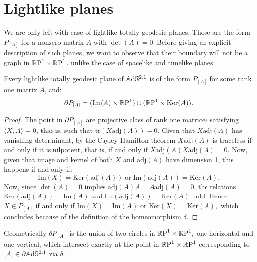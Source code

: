 \section{Lightlike planes}
We are only left with case of lightlike totally geodesic planes. Those are the form $P_{[A]}$ for a nonzero matrix $A$ with $\det(A)=0$. Before giving an explicit description of such planes, we want to observe that their boundary will not be a graph in $\T$, unlike the case of spacelike and timelike planes. 

\begin{lemma}\label{35}
    Every lightlike totally geodesic plane of $\A^{2,1}$ is of the form $P_{[A]}$ for some rank one matrix $A$, and: 
    \[
        \partial P_{[A]}=(\text{Im}(A)\times\S)\cup(\S\times\text{Ker}(A)).
    \]
\end{lemma}
\begin{proof}
    The point in $\partial P_{[A]}$ are projective class of rank one matrices satisfying $\langle X,A\rangle=0$, that is, such that $\text{tr}(X\text{adj}(A))=0.$ Given that $X\text{adj}(A)$ has vanishing determinant, by the Cayley-Hamilton theorem $X\text{adj}(A)$ is traceless if and only if it is nilpotent, that is, if and only if $X\text{adj}(A)X\text{adj}(A)=0.$ Now, given that image and kernel of both $X$ and $\text{adj}(A)$ have dimension 1, this happens if and only if: 
    \begin{equation}
        \text{Im}(X)=\text{Ker}(\text{adj}(A))\;\text{or}\;\text{Im}(\text{adj}(A))=\text{Ker}(A).
    \end{equation}
    Now, since $\det(A)=0$ implies $\text{adj}(A)A=A\text{adj}(A)=0$, the relations $\text{Ker}(\text{adj}(A))=\text{Im}(A)$ and $\text{Im}(\text{adj}(A))=\text{Ker}(A)$ hold. Hence $X\in P_{[A]}$ if and only if $\text{Im}(X)=\text{Im}(A)$ or $\text{Ker}(X)=\text{Ker}(A),$ which concludes because of the definition of the homeomorphism $\delta$.  
\end{proof}

Geometrically $\partial P_{[A]}$ is the union of two circles in $\T,$ one horizontal and one vertical, which intersect exactly at the point in $\T$ corresponding to $[A]\in \partial\A^{2,1}$ via $\delta$.\\

